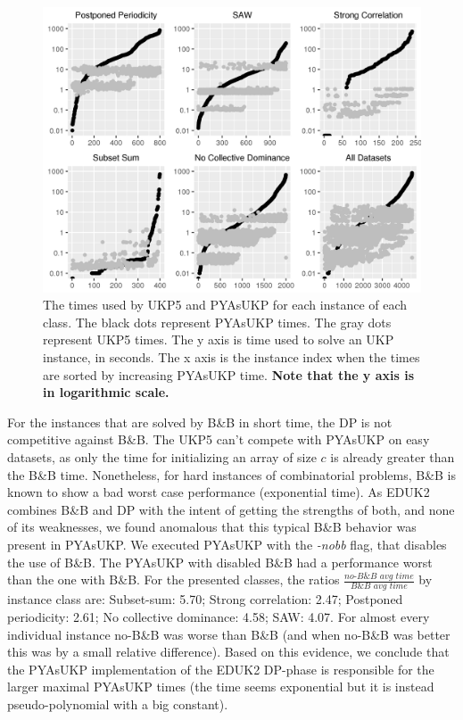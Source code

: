 \documentclass[runningheads,a4paper]{llncs}
\begin{document}
\begin{figure}[th]
  \label{fig:times}
  \centering
  \includegraphics[width=\textwidth]{six_plots.png}
  \caption{The times used by UKP5 and PYAsUKP for each instance of each class. The black dots represent PYAsUKP times. The gray dots represent UKP5 times. The y axis is time used to solve an UKP instance, in seconds. The x axis is the instance index when the times are sorted by increasing PYAsUKP time. \textbf{Note that the y axis is in logarithmic scale.}}
\end{figure}

For the instances that are solved by B\&B in short time, the DP is not competitive against B\&B. 
The UKP5 can't compete with PYAsUKP on easy datasets, as only the time for initializing an array of size \(c\) is already greater than the B\&B time. 
Nonetheless, for hard instances of combinatorial problems, B\&B is known to show a bad worst case performance (exponential time). 
As EDUK2 combines B\&B and DP with the intent of getting the strengths of both, and none of its weaknesses, we found anomalous that this typical B\&B behavior was present in PYAsUKP. 
We executed PYAsUKP with the \emph{-nobb} flag, that disables the use of B\&B. 
The PYAsUKP with disabled B\&B had a performance worst than the one with B\&B. 
For the presented classes, the ratios $\frac{\textit{no-B\&B~avg~time}}{\textit{B\&B~avg~time}}$ by instance class are: 
Subset-sum: 5.70; Strong correlation: 2.47; Postponed periodicity: 2.61; No collective dominance: 4.58; SAW: 4.07. 
For almost every individual instance no-B\&B was worse than B\&B (and when no-B\&B was better this was by a small relative difference). 
Based on this evidence, we conclude that the PYAsUKP implementation of the EDUK2 DP-phase is responsible for the larger maximal PYAsUKP times (the time seems exponential but it is instead pseudo-polynomial with a big constant).
\end{document}
